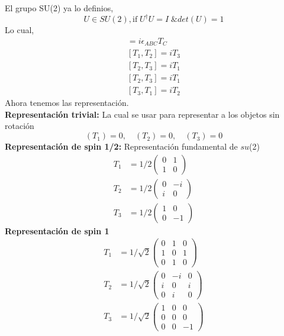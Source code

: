 \documentclass[../main.tex]{subfiles}
\begin{document}
El grupo SU(2) ya lo definios, 
\begin{equation*}
  U\in SU(2) ,\text{if}\; U^\dagger U = I \; \& det(U) = 1  
\end{equation*}
Lo cual,
\begin{align*}
  [T_A,T_B] = i\epsilon_{ABC}T_C \\
  [T_1,T_2] =iT_3 \\
  [T_2,T_3] = iT_1 \\
  [T_2,T_3] = iT_1 \\
  [T_3,T_1] = iT_2
\end{align*}
Ahora tenemos las representación.\\
\textbf{Representación trivial: } La cual se usar para representar a los objetos sin rotación
\begin{equation*}
  (T_1)= 0,\quad (T_2)= 0,\quad (T_3)=0
\end{equation*}
\textbf{Representación de spin 1/2:} Representación fundamental de $su$(2)
\begin{align*}
  T_1 & = 1/2\begin{pmatrix} 0 & 1 \\ 1 & 0 \end{pmatrix} \\
  T_2 & = 1/2\begin{pmatrix}0 & -i \\ i & 0 \end{pmatrix} \\
  T_3 & = 1/2\begin{pmatrix} 1 & 0 \\ 0 & -1 \end{pmatrix}
\end{align*}
\textbf{Representación de spin 1}
\begin{align*}
  T_1 & = 1/\sqrt{2}\begin{pmatrix} 0 & 1 & 0 \\ 1 & 0 & 1 \\ 0 & 1 & 0 \end{pmatrix} \\
  T_2 & = 1/\sqrt{2}\begin{pmatrix} 0 & -i & 0 \\ i & 0 & i \\ 0 & i & 0 \end{pmatrix} \\
  T_3 & = 1/\sqrt{2}\begin{pmatrix} 1 & 0 & 0 \\ 0 & 0 & 0 \\ 0 & 0 & -1 \end{pmatrix}
\end{align*}
\end{document}
